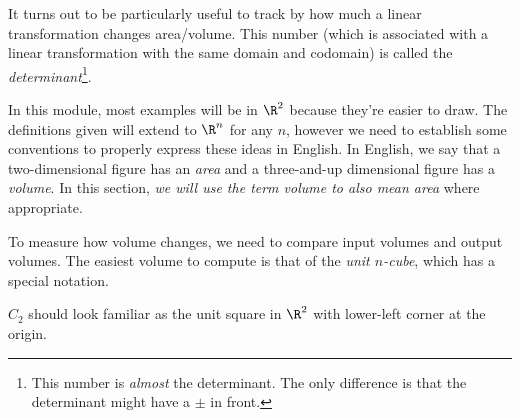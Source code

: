 It turns out to be particularly useful to track by how much a linear transformation
changes area/volume. This number (which is associated with a linear transformation with
the same domain and codomain) is called the \emph{determinant}\footnote{ This number is \emph{almost} the determinant.
The only difference is that the determinant might have a $\pm$ in front.}.


In this module, most examples will be in $\R^2$ because they're easier to draw.
The definitions given will extend to $\R^n$ for any $n$, however we need to establish some conventions
to properly express these ideas in English. In English, we say that a two-dimensional figure has an
\emph{area} and a three-and-up dimensional figure has a \emph{volume}. In this section, \emph{we
will use the term volume to also mean area} where appropriate.

To measure how volume changes, we need to compare input volumes and output volumes. 
The easiest volume to compute is that of the \emph{unit $n$-cube}, which has a special notation.


$C_2$ should look familiar as the unit square in $\R^2$ with lower-left corner at the origin.

\begin{center}
\end{center}

